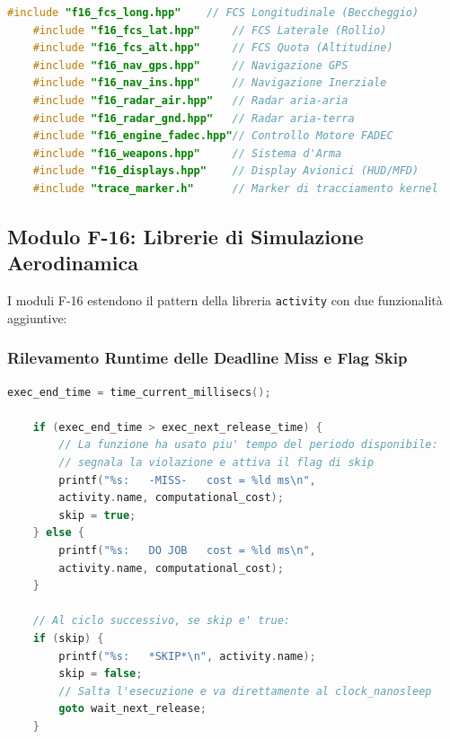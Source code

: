 \begin{lstlisting}[language=C++, caption={Include delle librerie avioniche in F16\_Computer.cpp}]
	#include "f16_fcs_long.hpp"    // FCS Longitudinale (Beccheggio)
	#include "f16_fcs_lat.hpp"     // FCS Laterale (Rollio)
	#include "f16_fcs_alt.hpp"     // FCS Quota (Altitudine)
	#include "f16_nav_gps.hpp"     // Navigazione GPS
	#include "f16_nav_ins.hpp"     // Navigazione Inerziale
	#include "f16_radar_air.hpp"   // Radar aria-aria
	#include "f16_radar_gnd.hpp"   // Radar aria-terra
	#include "f16_engine_fadec.hpp"// Controllo Motore FADEC
	#include "f16_weapons.hpp"     // Sistema d'Arma
	#include "f16_displays.hpp"    // Display Avionici (HUD/MFD)
	#include "trace_marker.h"      // Marker di tracciamento kernel
\end{lstlisting}

\subsection{Modulo F-16: Librerie di Simulazione Aerodinamica}
\label{sec:lib_f16}

I moduli F-16 estendono il pattern della libreria \texttt{activity} con due funzionalità aggiuntive:

\subsubsection{Rilevamento Runtime delle Deadline Miss e Flag Skip}

\begin{lstlisting}[language=C++, caption={Logica di rilevamento deadline miss e skip nei moduli F-16}]
	exec_end_time = time_current_millisecs();
	
	if (exec_end_time > exec_next_release_time) {
		// La funzione ha usato piu' tempo del periodo disponibile:
		// segnala la violazione e attiva il flag di skip
		printf("%s:   -MISS-   cost = %ld ms\n",
		activity.name, computational_cost);
		skip = true;
	} else {
		printf("%s:   DO JOB   cost = %ld ms\n",
		activity.name, computational_cost);
	}
	
	// Al ciclo successivo, se skip e' true:
	if (skip) {
		printf("%s:   *SKIP*\n", activity.name);
		skip = false;
		// Salta l'esecuzione e va direttamente al clock_nanosleep
		goto wait_next_release;
	}
\end{lstlisting}

